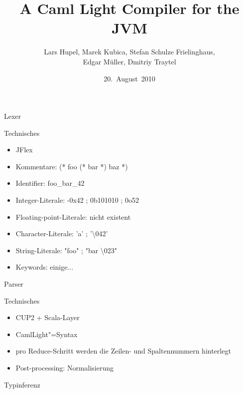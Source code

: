 \documentclass[hyperref={pdfpagelabels=false}]{beamer}
\title{A Caml Light Compiler for the JVM}
\author[Hupel, Kubica, Schulze Frielinghaus, Müller, Traytel]{Lars Hupel, Marek Kubica, Stefan Schulze Frielinghaus, \\Edgar Müller, Dmitriy Traytel}
\institute{TU~München}
\date{20.~August~2010}
\begin{document}
\frame{\titlepage}


\begin{frame}{Lexer}
  \begin{block}{Technisches}
    \begin{itemize}
      \item JFlex
      \item Kommentare: (* foo (* bar *) baz *)
      \item Identifier: foo\_bar\_42
      \item Integer-Literale: -0x42 ; 0b101010 ; 0o52
      \item Floating-point-Literale: nicht existent
      \item Character-Literale: 'a' ; '\textbackslash 042'
      \item String-Literale: "foo" ; "bar \textbackslash 023"
      \item Keywords: einige...
    \end{itemize}
  \end{block}
\end{frame}

\begin{frame}{Parser}
  \begin{block}{Technisches}
    \begin{itemize}
      \item CUP2 + Scala-Layer
      \item CamlLight"=Syntax
      \item pro Reduce-Schritt werden die Zeilen- und Spaltennummern hinterlegt
      \item Post-processing: Normalisierung
    \end{itemize}
  \end{block}
\end{frame}

\begin{frame}{Typinferenz}
\end{frame}
\end{document}
